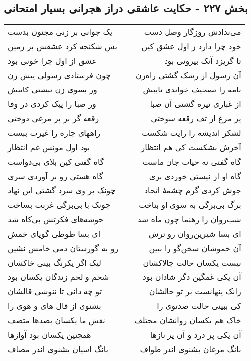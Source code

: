 \begin{center}
\section*{بخش ۲۲۷ - حکایت عاشقی دراز هجرانی بسیار امتحانی}
\label{sec:sh227}
\begin{longtable}{l p{0.5cm} r}
یک جوانی بر زنی مجنون بدست
&&
می‌ندادش روزگار وصل دست
\\
بس شکنجه کرد عشقش بر زمین
&&
خود چرا دارد ز اول عشق کین
\\
عشق از اول چرا خونی بود
&&
تا گریزد آنک بیرونی بود
\\
چون فرستادی رسولی پیش زن
&&
آن رسول از رشک گشتی راه‌زن
\\
ور بسوی زن نبشتی کاتبش
&&
نامه را تصحیف خواندی نایبش
\\
ور صبا را پیک کردی در وفا
&&
از غباری تیره گشتی آن صبا
\\
رقعه گر بر پر مرغی دوختی
&&
پر مرغ از تف رقعه سوختی
\\
راههای چاره را غیرت ببست
&&
لشکر اندیشه را رایت شکست
\\
بود اول مونس غم انتظار
&&
آخرش بشکست کی هم انتظار
\\
گاه گفتی کین بلای بی‌دواست
&&
گاه گفتی نه حیات جان ماست
\\
گاه هستی زو بر آوردی سری
&&
گاه او از نیستی خوردی بری
\\
چونک بر وی سرد گشتی این نهاد
&&
جوش کردی گرم چشمهٔ اتحاد
\\
چونک با بی‌برگی غربت بساخت
&&
برگ بی‌برگی به سوی او بتاخت
\\
خوشه‌های فکرتش بی‌کاه شد
&&
شب‌روان را رهنما چون ماه شد
\\
ای بسا طوطی گویای خمش
&&
ای بسا شیرین‌روان رو ترش
\\
رو به گورستان دمی خامش نشین
&&
آن خموشان سخن‌گو را ببین
\\
لیک اگر یکرنگ بینی خاکشان
&&
نیست یکسان حالت چالاکشان
\\
شحم و لحم زندگان یکسان بود
&&
آن یکی غمگین دگر شادان بود
\\
تو چه دانی تا ننوشی قالشان
&&
زانک پنهانست بر تو حالشان
\\
بشنوی از قال های و هوی را
&&
کی ببینی حالت صدتوی را
\\
نقش ما یکسان بضدها متصف
&&
خاک هم یکسان روانشان مختلف
\\
همچنین یکسان بود آوازها
&&
آن یکی پر درد و آن پر نازها
\\
بانگ اسپان بشنوی اندر مصاف
&&
بانگ مرغان بشنوی اندر طواف

\end{longtable}
\end{center}

